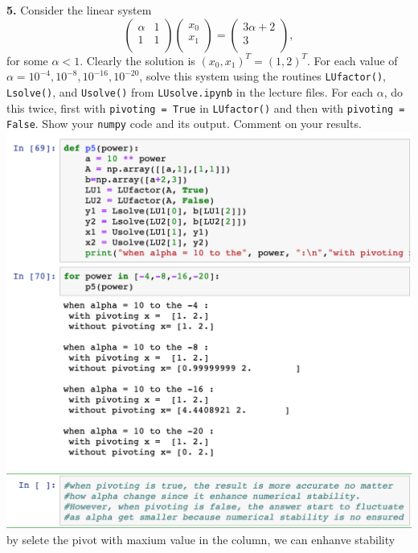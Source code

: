 \documentclass[11pt]{article}
\begin{document}
\par\bigskip
{\bf 5.} Consider the linear system
$$
   \left(
   \begin{array}{cc}
      \alpha & 1 \\ 	
           1 & 1 \\ 	
   \end{array} \right)
   \left(
   \begin{array}{c}
      x_0 \\ 	
      x_1 \\ 	
   \end{array} \right)
   =
   \left(
   \begin{array}{cc}3
      \alpha + 2 \\ 	
               3 \\ 	
   \end{array} \right),
$$
for some $\alpha < 1$.
Clearly the solution is $(x_0, x_1)^T = (1,2)^T$.
For each value of $\alpha = 10^{-4}, 10^{-8}, 10^{-16}, 10^{-20}$,
solve this system using the routines {\tt LUfactor()}, {\tt Lsolve()}, 
and {\tt Usolve()} from {\tt LUsolve.ipynb} in the lecture files.
For each $\alpha$, do this twice, first with {\tt pivoting = True} in {\tt LUfactor()}
and then with {\tt pivoting = False}.
Show your {\tt numpy} code and its output.
Comment on your results.\newline
\includegraphics[scale=0.8]{p5.png}
\\by selete the pivot with maxium value in the column, we can enhanve stability
\newpage
\end{document}
